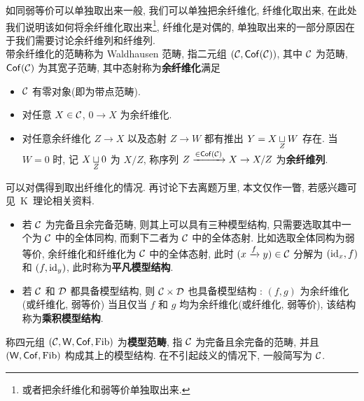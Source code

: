 \begin{remark}[Waldhausen 范畴]
    如同弱等价可以单独取出来一般, 我们可以单独把余纤维化, 纤维化取出来, 在此处我们说明该如何将余纤维化取出来\footnote{或者把余纤维化和弱等价单独取出来.}, 纤维化是对偶的, 单独取出来的一部分原因在于我们需要讨论余纤维列和纤维列.\\
    带余纤维化的范畴称为 Waldhausen 范畴, 指二元组 $(\cal{C},\mathsf{Cof}(C))$, 其中 $\cal{C}$ 为范畴, $\mathsf{Cof}(\cal{C})$ 为其宽子范畴, 其中态射称为\textbf{余纤维化}满足
    \begin{itemize}
        \item $\cal{C}$ 有零对象(即为带点范畴).
        \item 对任意 $X\in \cal{C}$, $0 \to X$ 为余纤维化.
        \item 对任意余纤维化 $Z \to X$ 以及态射 $Z \to W$ 都有推出 $Y = X\underset{Z}{\sqcup}W$ 存在. 当 $W= 0$ 时, 记 $X\underset{Z}{\sqcup}0$ 为 $X/Z$, 称序列 $Z\xrightarrow{\in \mathsf{Cof}(\cal{C})}X\to X/Z$ 为\textbf{余纤维列}.
    \end{itemize}
    可以对偶得到取出纤维化的情况. 再讨论下去离题万里, 本文仅作一瞥, 若感兴趣可见~K~理论相关资料.
\end{remark}
\begin{example}
    \begin{itemize}
        \item 若 $\cal{C}$ 为完备且余完备范畴, 则其上可以具有三种模型结构, 只需要选取其中一个为 $\cal{C}$ 中的全体同构, 而剩下二者为 $\cal{C}$ 中的全体态射. 比如选取全体同构为弱等价, 余纤维化和纤维化为 $\cal{C}$ 中的全体态射, 此时 $(x\xrightarrow{f}y)\in \cal{C}$ 分解为 $(\mathrm{id}_x,f)$ 和 $(f,\mathrm{id}_y)$, 此时称为\textbf{平凡模型结构}.
        \item 若 $\cal{C}$ 和 $\cal{D}$ 都具备模型结构, 则 $\cal{C}\times D$ 也具备模型结构 : $(f,g)$ 为余纤维化(或纤维化, 弱等价) 当且仅当 $f$ 和 $g$ 均为余纤维化(或纤维化, 弱等价), 该结构称为\textbf{乘积模型结构}.
    \end{itemize}
\end{example}
\begin{definition}[模型范畴]\label{定义:模型范畴}
    称四元组 $(\mathcal{C},\mathsf{W},\mathsf{Cof},\operatorname{Fib})$ 为\textbf{模型范畴}, 指 $\cal{C}$ 为完备且余完备的范畴, 并且 $(\mathsf{W},\mathsf{Cof},\operatorname{Fib})$ 构成其上的模型结构. 在不引起歧义的情况下, 一般简写为 $\cal{C}$.
\end{definition}

